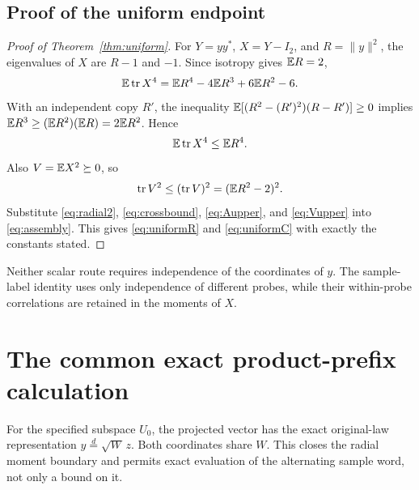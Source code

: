 \documentclass[11pt]{article}
\numberwithin{equation}{section}
\theoremstyle{definition}\newtheorem{definition}[theorem]{Definition}
\theoremstyle{remark}\newtheorem{remark}[theorem]{Remark}
\newcommand{\tr}{\operatorname{tr}}\newcommand{\Ent}{\operatorname{Ent}}
\newcommand{\norm}[1]{\lVert#1\rVert}\newcommand{\ip}[2]{\langle#1,#2\rangle}
\begin{document}
\subsection{Proof of the uniform endpoint}
\begin{proof}[Proof of Theorem~\ref{thm:uniform}]
For $Y=yy^*$, $X=Y-I_2$, and $R=\norm y^2$, the eigenvalues of $X$ are
$R-1$ and $-1$. Since isotropy gives $\mathbb E R=2$,
\[
 \E\tr X^4=\E R^4-4\E R^3+6\E R^2-6.
\]
With an independent copy $R'$, the inequality
$\mathbb E[(R^2-(R')^2)(R-R')]\ge0$ implies
$\mathbb E R^3\ge(\mathbb E R^2)(\mathbb E R)=2\mathbb E R^2$. Hence
\begin{equation}\label{eq:Aupper}
 \E\tr X^4\le\E R^4.
\end{equation}
Also $V=\mathbb E X^2\succeq0$, so
\begin{equation}\label{eq:Vupper}
 \tr V^2\le(\tr V)^2=(\E R^2-2)^2.
\end{equation}
Substitute \eqref{eq:radial2}, \eqref{eq:crossbound}, \eqref{eq:Aupper}, and
\eqref{eq:Vupper} into \eqref{eq:assembly}. This gives
\eqref{eq:uniformR} and \eqref{eq:uniformC} with exactly the constants stated.
\end{proof}

Neither scalar route requires independence of the coordinates of $y$. The
sample-label identity uses only independence of different probes, while their
within-probe correlations are retained in the moments of $X$.

\par{}
\section{The common exact product-prefix calculation}\label{sec:exact}
\begin{takeaway}
For the specified subspace $U_0$, the projected vector has the exact original-law
representation $y\stackrel d=\sqrt W\,z$. Both coordinates share $W$.
This closes the radial moment boundary and permits exact evaluation of the
alternating sample word, not only a bound on it.
\end{takeaway}
\end{document}
